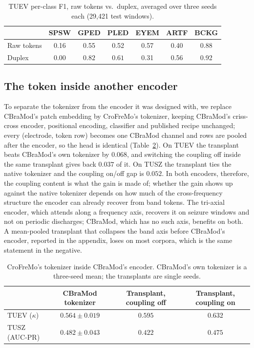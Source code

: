 \begin{table}[t]
\centering
\small
\caption{TUEV per-class F1, raw tokens vs.\ duplex, averaged over three
seeds each (29,421 test windows).}
\label{tab:perclass}
\begin{tabular}{lcccccc}
\toprule
 & SPSW & GPED & PLED & EYEM & ARTF & BCKG \\
\midrule
Raw tokens & 0.16 & 0.55 & 0.52 & 0.57 & 0.40 & 0.88 \\
Duplex & 0.00 & $\mathbf{0.82}$ & $\mathbf{0.61}$ & 0.31 & 0.56 & 0.92 \\
\bottomrule
\end{tabular}
\end{table}

\subsection{The token inside another encoder}
\label{sec:transplant}

To separate the tokenizer from the encoder it was designed with, we
replace CBraMod's patch embedding by CroFreMo's tokenizer, keeping CBraMod's
criss-cross encoder, positional encoding, classifier and published recipe
unchanged; every (electrode, token row) becomes one CBraMod channel and rows
are pooled after the encoder, so the head is identical
(Table~\ref{tab:transplant}). On TUEV the transplant beats CBraMod's own
tokenizer by $0.068$, and switching the coupling off inside the same
transplant gives back $0.037$ of it. On TUSZ the transplant ties the native
tokenizer and the coupling on/off gap is $0.052$. In both encoders,
therefore, the coupling content is what the gain is made of; whether the
gain shows up against the native tokenizer depends on how much of the
cross-frequency structure the encoder can already recover from band
tokens. The tri-axial encoder, which attends along a frequency axis,
recovers it on seizure windows and not on periodic discharges; CBraMod,
which has no such axis, benefits on both. A mean-pooled transplant that
collapses the band axis before CBraMod's encoder, reported in the appendix,
loses on most corpora, which is the same statement in the negative.

\begin{table}[t]
\centering
\small
\caption{CroFreMo's tokenizer inside CBraMod's encoder. CBraMod's own
tokenizer is a three-seed mean; the transplants are single seeds.}
\label{tab:transplant}
\begin{tabular}{lccc}
\toprule
 & CBraMod tokenizer & Transplant, coupling off & Transplant, coupling on \\
\midrule
TUEV ($\kappa$) & $0.564 \pm 0.019$ & $0.595$ & $\mathbf{0.632}$ \\
TUSZ (AUC-PR) & $0.482 \pm 0.043$ & $0.422$ & $0.475$ \\
\bottomrule
\end{tabular}
\end{table}

